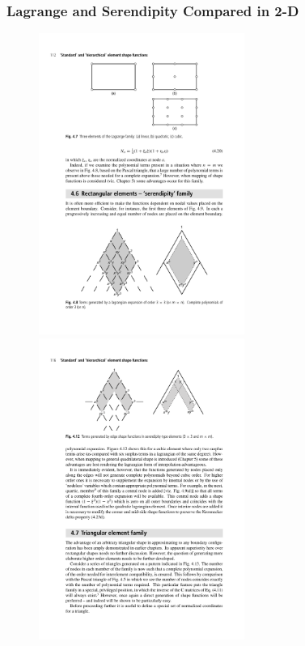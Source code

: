 \documentclass[serif,12pt]{beamer}
\begin{document}
\begin{frame}
\frametitle{Lagrange and Serendipity Compared in 2-D}
	\begin{figure}
		\includegraphics[width=0.6\textwidth]{figures/bookFig3.pdf}\\
	    \includegraphics[width=0.6\textwidth]{figures/bookFig4.pdf}
	    \let\thefootnote\relax{}
	\end{figure}
\end{frame}
\end{document}
